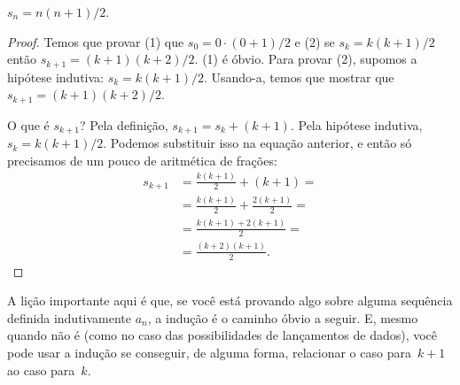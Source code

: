 \documentclass[../../../include/open-logic-section]{subfiles}
\begin{document}
\begin{prop}
  $s_n = n(n+1)/2$.
\end{prop}

\begin{proof}
  Temos que provar (1) que $s_0 = 0\cdot(0 + 1)/2$ e (2) se $s_k =
  k(k+1)/2$ então $s_{k+1} = (k+1)(k+2)/2$.  (1) é óbvio. Para provar
  (2), supomos a hipótese indutiva: $s_k = k(k+1)/2$. Usando-a,
  temos que mostrar que $s_{k+1} = (k+1)(k+2)/2$.

  O que é $s_{k+1}$?  Pela definição, $s_{k+1} = s_k + (k+1)$.  Pela
  hipótese indutiva, $s_k = k(k+1)/2$. Podemos substituir isso na
  equação anterior, e então só precisamos de um pouco de aritmética de
  frações:
  \begin{align*}
    s_{k+1} & = \frac{k(k+1)}{2} + (k+1) = {}\\
    & = \frac{k(k+1)}{2} + \frac{2(k+1)}{2} = {}\\
    & = \frac{k(k+1) + 2(k+1)}{2} = {}\\
    & = \frac{(k+2)(k+1)}{2}.
  \end{align*}
\end{proof}

A lição importante aqui é que, se você está provando algo sobre
alguma sequência definida indutivamente $a_n$, a indução é o caminho óbvio
a seguir. E, mesmo quando não é (como no caso das possibilidades de
lançamentos de dados), você pode usar a indução se conseguir, de alguma forma, relacionar o caso
para~$k+1$ ao caso para~$k$.
\end{document}
